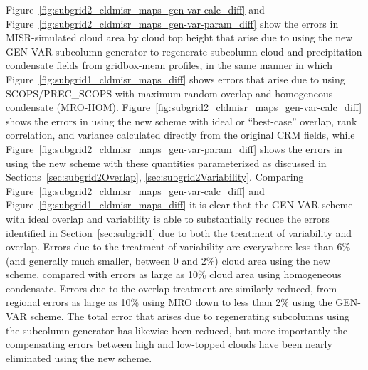 Figure~\ref{fig:subgrid2_cldmisr_maps_gen-var-calc_diff} and
Figure~\ref{fig:subgrid2_cldmisr_maps_gen-var-param_diff} show the
errors in MISR-simulated cloud area by cloud top height that arise due
to using the new GEN-VAR subcolumn generator to regenerate subcolumn
cloud and precipitation condensate fields from gridbox-mean profiles, in
the same manner in which Figure~\ref{fig:subgrid1_cldmisr_maps_diff}
shows errors that arise due to using SCOPS/PREC\_SCOPS with
maximum-random overlap and homogeneous condensate (MRO-HOM).
Figure~\ref{fig:subgrid2_cldmisr_maps_gen-var-calc_diff} shows the
errors in using the new scheme with ideal or ``best-case'' overlap, rank
correlation, and variance calculated directly from the original CRM
fields, while Figure~\ref{fig:subgrid2_cldmisr_maps_gen-var-param_diff}
shows the errors in using the new scheme with these quantities
parameterized as discussed in
Sections~\ref{sec:subgrid2Overlap}, \ref{sec:subgrid2Variability}.
Comparing Figure~\ref{fig:subgrid2_cldmisr_maps_gen-var-calc_diff} and
Figure~\ref{fig:subgrid1_cldmisr_maps_diff} it is clear that the GEN-VAR
scheme with ideal overlap and variability is able to substantially
reduce the errors identified in Section~\ref{sec:subgrid1} due to both
the treatment of variability and overlap. Errors due to the treatment of
variability are everywhere less than 6\% (and generally much smaller,
between 0 and 2\%) cloud area using the new scheme, compared with errors
as large as 10\% cloud area using homogeneous condensate. Errors due to
the overlap treatment are similarly reduced, from regional errors as
large as 10\% using MRO down to less than 2\% using the GEN-VAR scheme.
The total error that arises due to regenerating subcolumns using the
subcolumn generator has likewise been reduced, but more importantly the
compensating errors between high and low-topped clouds have been nearly
eliminated using the new scheme.

